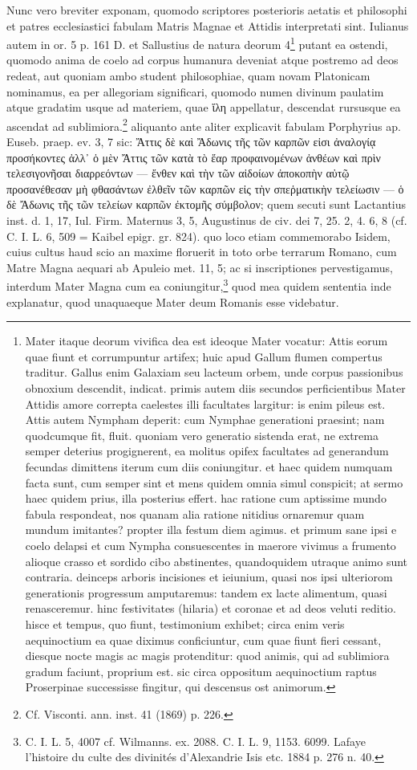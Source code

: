 \documentclass[a4paper, 11pt, oneside, polutonikogreek, german, twocolumn]{article}
\begin{document}
Nunc vero breviter exponam, quomodo scriptores posterioris aetatis et philosophi et patres ecclesiastici fabulam Matris Magnae et Attidis interpretati sint. Iulianus autem in or. 5 p. 161 D. et Sallustius de natura deorum 4\footnote{Mater itaque deorum vivifica dea est ideoque Mater vocatur: Attis eorum quae fiunt et corrumpuntur artifex; huic apud Gallum flumen compertus traditur. Gallus enim Galaxiam seu lacteum orbem, unde corpus passionibus obnoxium descendit, indicat. primis autem diis secundos perficientibus Mater Attidis amore correpta caelestes illi facultates largitur: is enim pileus est. Attis autem Nympham deperit: cum Nymphae generationi praesint; nam quodcumque fit, fluit. quoniam vero generatio sistenda erat, ne extrema semper deterius progignerent, ea molitus opifex facultates ad generandum fecundas dimittens iterum cum diis coniungitur. et haec quidem numquam facta sunt, cum semper sint et mens quidem omnia simul conspicit; at sermo haec quidem prius, illa posterius effert. hac ratione cum aptissime mundo fabula respondeat, nos quanam alia ratione nitidius ornaremur quam mundum imitantes? propter illa festum diem agimus. et primum sane ipsi e coelo delapsi et cum Nympha consuescentes in maerore vivimus a frumento alioque crasso et sordido cibo abstinentes, quandoquidem utraque animo sunt contraria. deinceps arboris incisiones et ieiunium, quasi nos ipsi ulteriorom generationis progressum amputaremus: tandem ex lacte alimentum, quasi renasceremur. hinc festivitates (hilaria) et coronae et ad deos veluti reditio. hisce et tempus, quo fiunt, testimonium exhibet; circa enim veris aequinoctium ea quae diximus conficiuntur, cum quae fiunt fieri cessant, diesque nocte magis ac magis protenditur: quod animis, qui ad sublimiora gradum faciunt, proprium est. sic circa oppositum aequinoctium raptus Proserpinae successisse fingitur, qui descensus ost animorum.} putant ea ostendi, quomodo anima de coelo ad corpus humanura deveniat atque postremo ad deos redeat, aut quoniam ambo student philosophiae, quam novam Platonicam nominamus, ea per allegoriam significari, quomodo numen divinum paulatim atque gradatim usque ad materiem, quae ἵλη appellatur, descendat rursusque ea ascendat ad sublimiora.\footnote{Cf. Visconti. ann. inst. 41 (1869) p. 226.} aliquanto ante aliter explicavit fabulam Porphyrius ap. Euseb. praep. ev. 3, 7 sic: Ἄττις δὲ καὶ Ἄδωνις τῆς τῶν καρπῶν εἰσι ἀναλογίᾳ προσήκοντες ἀλλ᾽ ὁ μὲν Ἄττις τῶν κατὰ τὸ ἕαρ προφαινομένων ἀνθέων καὶ πρὶν τελεσιγονῆσαι διαρρεόντων --- ἔνθεν καὶ τὴν τῶν αἰδοίων ἀποκοπὴν αὐτῷ προσανέθεσαν μὴ φθασάντων ἐλθεῖν τῶν καρπῶν εἰς τὴν σπεῥματικὴν τελείωσιν --- ὁ δὲ Ἄδωνις τῆς τῶν τελείων καρπῶν ἐκτομῆς σύμβολον; quem secuti sunt Lactantius inst. d. 1, 17, Iul. Firm. Maternus 3, 5, Augustinus de civ. dei 7, 25. 2, 4. 6, 8 (cf. C. I. L. 6, 509 = Kaibel epigr. gr. 824). quo loco etiam commemorabo Isidem, cuius cultus haud scio an maxime floruerit in toto orbe terrarum Romano, cum Matre Magna aequari ab Apuleio met. 11, 5; ac si inscriptiones pervestigamus, interdum Mater Magna cum ea coniungitur,\footnote{C. I. L. 5, 4007 cf. Wilmanns. ex. 2088. C. I. L. 9, 1153. 6099. Lafaye l'histoire du culte des divinités d'Alexandrie Isis etc. 1884 p. 276 n. 40.} quod mea quidem sententia inde explanatur, quod unaquaeque Mater deum Romanis esse videbatur.
\end{document}
